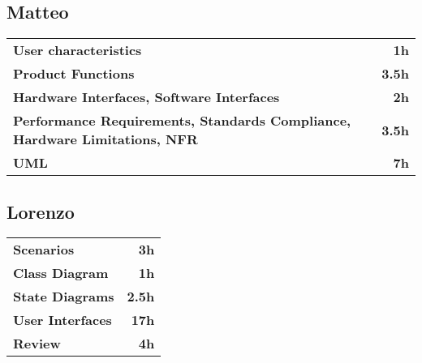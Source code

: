 \subsection*{Matteo}
\begin{table}[H]
    \begin{tabular}{lr}
        \toprule
        \textbf{User characteristics}                                                      & \textbf{1h}   \\
        \textbf{Product Functions}                                                         & \textbf{3.5h} \\
        \textbf{Hardware Interfaces, Software Interfaces}                                  & \textbf{2h}   \\
        \textbf{Performance Requirements, Standards Compliance, Hardware Limitations, NFR} & \textbf{3.5h} \\
        \textbf{UML}                                                                       & \textbf{7h}   \\
        \bottomrule
    \end{tabular}
\end{table}

\subsection*{Lorenzo}
\begin{table}[H]
    \begin{tabular}{lr}
        \toprule
        \textbf{Scenarios}       & \textbf{3h}   \\
        \textbf{Class Diagram}   & \textbf{1h}   \\
        \textbf{State Diagrams}  & \textbf{2.5h} \\
        \textbf{User Interfaces} & \textbf{17h}  \\
        \textbf{Review}          & \textbf{4h}   \\
        \bottomrule
    \end{tabular}
\end{table}
